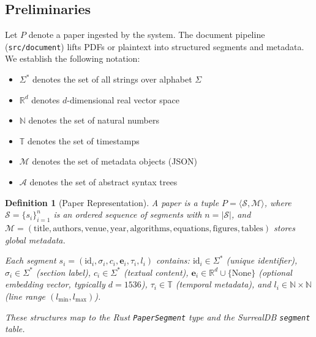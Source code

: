 \documentclass{ieeeaccess}
\newtheorem{definition}{Definition}
\begin{document}
\subsection{Preliminaries}
Let \(P\) denote a paper ingested by the system. The document pipeline (\texttt{src/document}) lifts PDFs or plaintext into structured segments and metadata. We establish the following notation:
\begin{itemize}
\item \(\Sigma^*\) denotes the set of all strings over alphabet \(\Sigma\)
\item \(\mathbb{R}^{d}\) denotes \(d\)-dimensional real vector space
\item \(\mathbb{N}\) denotes the set of natural numbers
\item \(\mathbb{T}\) denotes the set of timestamps
\item \(\mathcal{M}\) denotes the set of metadata objects (JSON)
\item \(\mathcal{A}\) denotes the set of abstract syntax trees
\end{itemize}

\begin{definition}[Paper Representation]
A paper is a tuple \(P = \langle \mathcal{S}, \mathcal{M} \rangle\), where \(\mathcal{S} = \{s_i\}_{i=1}^{n}\) is an ordered sequence of segments with \(n = |\mathcal{S}|\), and \(\mathcal{M} = (\text{title}, \text{authors}, \text{venue}, \text{year}, \text{algorithms}, \text{equations}, \text{figures}, \text{tables})\) stores global metadata.

Each segment \(s_i = (\text{id}_i, \sigma_i, c_i, \mathbf{e}_i, \tau_i, l_i)\) contains: \(\text{id}_i \in \Sigma^*\) (unique identifier), \(\sigma_i \in \Sigma^*\) (section label), \(c_i \in \Sigma^*\) (textual content), \(\mathbf{e}_i \in \mathbb{R}^{d} \cup \{\text{None}\}\) (optional embedding vector, typically \(d=1536\)), \(\tau_i \in \mathbb{T}\) (temporal metadata), and \(l_i \in \mathbb{N} \times \mathbb{N}\) (line range \((l_{\min}, l_{\max})\)).

These structures map to the Rust \texttt{PaperSegment} type and the SurrealDB \texttt{segment} table.
\end{definition}
\end{document}
